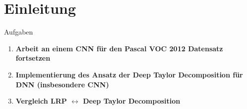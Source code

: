 \section{Einleitung}

\begin{frame}{Aufgaben}
\begin{large}
\centering
\begin{enumerate}
\item \textbf{Arbeit an einem CNN für den Pascal VOC 2012 Datensatz fortsetzen}
\item \textbf{Implementierung des Ansatz der Deep Taylor Decomposition für DNN (insbesondere CNN)}
\item \textbf{Vergleich LRP $\leftrightarrow$ Deep Taylor Decomposition}
\end{enumerate}
\end{large}
\end{frame}